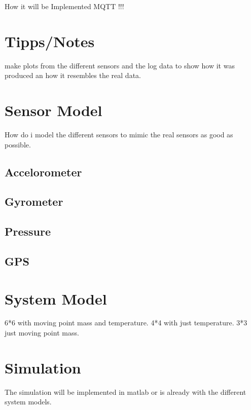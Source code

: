 How it will be Implemented
MQTT !!!
\section{Tipps/Notes}
make plots from the different sensors and the log data to show how it was 
produced an how it resembles the real data.


\section{Sensor Model}
How do i model the different sensors to mimic the real sensors as good as possible.

\subsection{Accelorometer}
\subsection{Gyrometer}
\subsection{Pressure}
\subsection{GPS}

\section{System Model}
6*6 with moving point mass and temperature.
4*4 with just temperature.
3*3 just moving point mass.

\section{Simulation}
The simulation will be implemented in matlab
or is already with the different system models.
